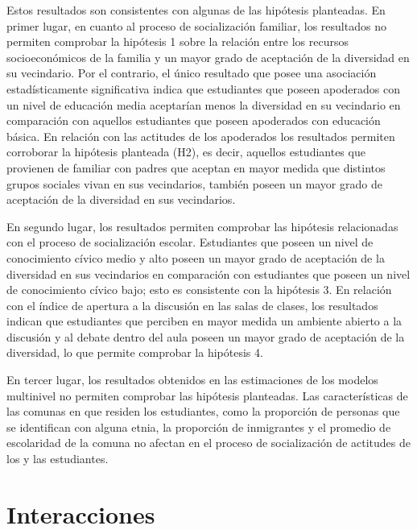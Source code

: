 \documentclass[12pt,twoside]{templates/facsothesis}
\begin{document}
Estos resultados son consistentes con algunas de las hipótesis planteadas. En primer lugar, en cuanto al proceso de socialización familiar, los resultados no permiten comprobar la hipótesis 1 sobre la relación entre los recursos socioeconómicos de la familia y un mayor grado de aceptación de la diversidad en su vecindario. Por el contrario, el único resultado que posee una asociación estadísticamente significativa indica que estudiantes que poseen apoderados con un nivel de educación media aceptarían menos la diversidad en su vecindario en comparación con aquellos estudiantes que poseen apoderados con educación básica. En relación con las actitudes de los apoderados los resultados permiten corroborar la hipótesis planteada (H2), es decir, aquellos estudiantes que provienen de familiar con padres que aceptan en mayor medida que distintos grupos sociales vivan en sus vecindarios, también poseen un mayor grado de aceptación de la diversidad en sus vecindarios.

En segundo lugar, los resultados permiten comprobar las hipótesis relacionadas con el proceso de socialización escolar. Estudiantes que poseen un nivel de conocimiento cívico medio y alto poseen un mayor grado de aceptación de la diversidad en sus vecindarios en comparación con estudiantes que poseen un nivel de conocimiento cívico bajo; esto es consistente con la hipótesis 3. En relación con el índice de apertura a la discusión en las salas de clases, los resultados indican que estudiantes que perciben en mayor medida un ambiente abierto a la discusión y al debate dentro del aula poseen un mayor grado de aceptación de la diversidad, lo que permite comprobar la hipótesis 4.

En tercer lugar, los resultados obtenidos en las estimaciones de los modelos multinivel no permiten comprobar las hipótesis planteadas. Las características de las comunas en que residen los estudiantes, como la proporción de personas que se identifican con alguna etnia, la proporción de inmigrantes y el promedio de escolaridad de la comuna no afectan en el proceso de socialización de actitudes de los y las estudiantes.

\hypertarget{interacciones}{%
\section{Interacciones}\label{interacciones}}
\end{document}
